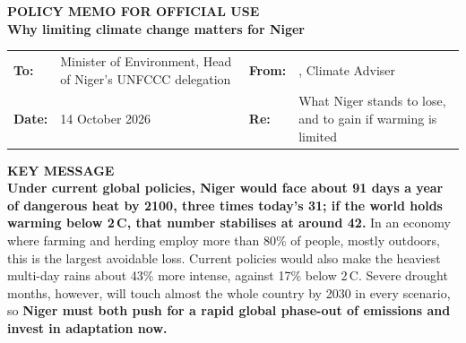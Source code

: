 \documentclass[10pt,a4paper]{article}
\newcommand{\AuthorName}{\todo{Your name}}
\newcommand{\todo}[1]{}
\newcommand{\todo}[1]{\begingroup\setlength{\fboxsep}{1pt}%
    \colorbox{yellow}{\textbf{\strut#1}}\endgroup}
\newcommand{\degC}{\,\textdegree C}
\begin{document}
\begin{tcolorbox}[colback=navy,colframe=navy,arc=0pt,boxrule=0pt,
                  left=8pt,right=8pt,top=6pt,bottom=7pt]
{\color{white!70!navy}\scriptsize\bfseries POLICY MEMO \textbullet{} FOR OFFICIAL USE}\\[2pt]
{\color{white}\LARGE\bfseries Why limiting climate change matters for Niger}
\end{tcolorbox}
\vspace{-4pt}
{\small
\begin{tabularx}{\linewidth}{@{}l Y l Y@{}}
\textbf{To:}   & Minister of Environment, Head of Niger's UNFCCC delegation &
\textbf{From:} & \AuthorName, Climate Adviser \\
\textbf{Date:} & 14 October 2026 &
\textbf{Re:}   & What Niger stands to lose, and to gain if warming is limited \\
\end{tabularx}}

\vspace{2pt}
\begin{tcolorbox}[colback=msgbg,colframe=brick,boxrule=0pt,leftrule=3pt,arc=0pt,
                  left=7pt,right=7pt,top=4pt,bottom=4pt]
{\color{brick}\small\bfseries KEY MESSAGE}\\[1pt]
\textbf{Under current global policies, Niger would face about 91 days a year of dangerous heat by 2100,
three times today's 31; if the world holds warming below 2\degC, that number stabilises at around 42.}
In an economy where farming and herding employ more than 80\% of people, mostly outdoors, this is the
largest avoidable loss. Current policies would also make the heaviest multi-day rains about 43\% more
intense, against 17\% below 2\degC. Severe drought months, however, will touch almost the whole country by 2030
in every scenario, so \textbf{Niger must both push for a rapid global phase-out of emissions and invest in
adaptation now.}
\end{tcolorbox}

\end{document}
